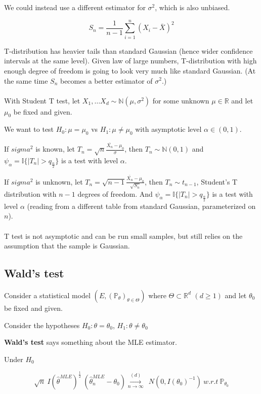 \documentclass{article}
\begin{document}
We could instead use a different estimator for $\sigma^2$, which is also unbiased.

$$
S_n = \frac{1}{n - 1}\sum_{i = 1}^{n}(X_i - \bar{X})^2
$$

T-distribution has heavier tails than standard Gaussian (hence wider confidence intervals at the same level).
Given law of large numbers, T-distribution with high enough degree of freedom is going to look very much like standard Gaussian.
(At the same time $S_n$ becomes a better estimator of $\sigma^2$.)
\\
\\

With Student T test, let $X_1, \dots X_d \sim \mathbb{N}(\mu, \sigma^2)$ for some unknown $\mu \in \mathbb{R}$ and let $\mu_0$ be fixed and given.

We want to test $H_0: \mu = \mu_0$ vs $H_1: \mu \neq \mu_0$ with asymptotic level $\alpha \in (0, 1)$.

If $sigma^2$ is known, let $T_n = \sqrt{n} \frac{\bar{X_n} - \mu_0}{\sigma}$, then $T_n \sim \mathbb{N}(0, 1)$ and
$\psi_{\alpha} = \mathbb{I}\{|T_n| > q_{\frac{\alpha}{2}}\}$ is a test with level $\alpha$.

If $sigma^2$ is unknown, let $T_n = \sqrt{n - 1}\frac{\bar{X_n} - \mu_0}{\sqrt{S_n}}$, then $T_n \sim t_{n - 1}$, Student's T distribution with $n - 1$ degrees of freedom. And
$\psi_{\alpha} = \mathbb{I}\{|T_n| > q_{\frac{\alpha}{2}}\}$ is a test with level $\alpha$ (reading from a different table from standard Gaussian, parameterized on $n$).
\\
\\
T test is not asymptotic and can be run small samples, but still relies on the assumption that the sample is Gaussian.

\subsection{Wald's test}

Consider a statistical model $(E, (\mathbb{P}_\theta)_{\theta \in \Theta})$ where $\Theta \subset \mathbb{R}^d$ $(d \geq 1)$ and let $\theta_0$ be fixed and given.

Consider the hypotheses $H_0: \theta = \theta_0$, $H_1: \theta \neq \theta_0$

\textbf{Wald's test} says something about the MLE estimator.

Under $H_0$

$$
\sqrt{n} ~ I(\hat{\theta}^{MLE})^{\frac{1}{2}} ~ (\hat{\theta}^{MLE}_{n} - \theta_0) \overset{(d)}{\underset{n \to \infty}{\longrightarrow}} ~ ~ \mathit{N}(0, I(\theta_0)^{-1}) ~ w.r.t ~ \mathbb{P}_{\theta_0}
$$
\end{document}
